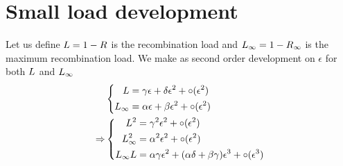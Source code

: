 \documentclass{article}
\begin{document}
\section*{Small load development}
Let us define $L = 1 - R $ is the recombination load and $L_{\infty} = 1 - {R_{\infty}} $ is the maximum recombination load.
We make as second order development on $\epsilon$ for both $L$ and $L_{\infty}$
\begin{align}
&\left\{
  \begin{aligned}
         L &= \gamma \epsilon + \delta \epsilon^2 + \circ ( \epsilon^2) \\
         L_{\infty} &= \alpha \epsilon + \beta \epsilon^2 + \circ ( \epsilon^2)  \\
  \end{aligned}
   \right.
   \\ \Rightarrow
&\left\{
  \begin{aligned}
         L^2 &= \gamma^2 \epsilon^2 + \circ ( \epsilon^2) \\
         L_{\infty}^2 &= \alpha^2 \epsilon^2 + \circ ( \epsilon^2)  \\
         L_{\infty} L&= \alpha \gamma \epsilon^2 + (\alpha \delta + \beta \gamma)  \epsilon^3 + \circ ( \epsilon^3)   \\
  \end{aligned}
   \right.
\end{align}
\end{document}
